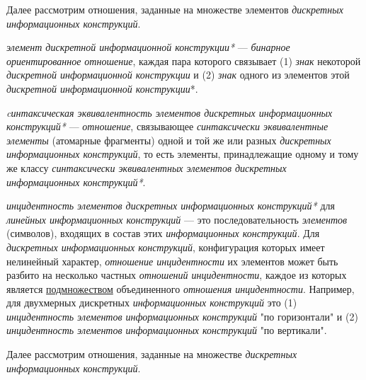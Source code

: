 Далее рассмотрим отношения, заданные на множестве элементов \textit{дискретных информационных конструкций}.

\begin{SCn}


\end{SCn}

\textit{элемент дискретной информационной конструкции*} --- \textit{бинарное ориентированное отношение}, каждая пара которого связывает (1) \textit{знак} некоторой \textit{дискретной информационной конструкции} и (2) \textit{знак} одного из элементов этой \textit{дискретной информационной конструкции}*.

\textit{cинтаксическая эквивалентность элементов дискретных информационных конструкций*} --- \textit{отношение}, связывающее \textit{синтаксически эквивалентные элементы} (атомарные фрагменты) одной и той же или разных \textit{дискретных информационных конструкций}, то есть элементы, принадлежащие одному и тому же классу \textit{синтаксически эквивалентных элементов дискретных информационных конструкций*}.

\textit{инцидентность элементов дискретных информационных конструкций*} для \textit{линейных информационных конструкций} --- это последовательность \textit{элементов} (символов), входящих в состав этих \textit{информационных конструкций}.
Для \textit{дискретных информационных конструкций}, конфигурация которых имеет нелинейный характер, \textit{отношение инцидентности} их элементов может быть разбито на несколько частных \textit{отношений инцидентности}, каждое из которых является \underline{подмножеством} объединенного \textit{отношения инцидентности}.
Например, для двухмерных дискретных \textit{информационных конструкций} это (1) \textit{инцидентность элементов информационных конструкций} "по горизонтали"{} и (2) \textit{инцидентность элементов информационных конструкций} "по вертикали"{}.

Далее рассмотрим отношения, заданные на множестве \textit{дискретных информационных конструкций}.

